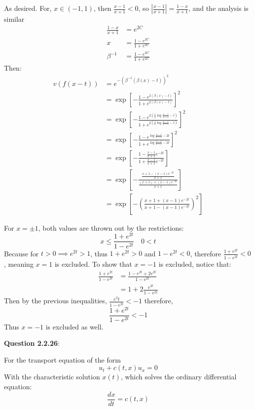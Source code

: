 \documentclass{article} %
\newcommand{\question}[2][]{
  \begin{flushleft}
    \textbf{Question #1}: \textit{#2}

\end{flushleft}}
\begin{document}
As desired. For, $x \in (-1, 1)$, then $\frac{x-1}{x+1} < 0$, so
$\left|\frac{x-1}{x+1}\right| = \frac{1-x}{x+1}$, and the analysis is similar
\begin{align*}
  \frac{1-x}{x+1} &= e^{2C} \\
  x &= \frac{1-e^{2C}}{1+e^{2C}} \\
  \beta^{-1} &= \frac{1-e^{2C}}{1+e^{2C}}
\end{align*}
Then:
\begin{align*}
  v(f(x - t)) &= e^{-(\beta^{-1}(\beta(x) - t))^2} \\
  &= \exp\left[-\frac{1-e^{2(\beta(x) - t)}}{1+e^{2(\beta(x) -t)}}\right]^2 \\
  &= \exp\left[-\frac{1-e^{2(\frac{1}{2}\log\frac{x-1}{x+1} -
  t)}}{1+e^{2(\frac{1}{2}\log\frac{x-1}{x+1} -t)}}\right]^2 \\
  &= \exp\left[-\frac{1-e^{\log\frac{x-1}{x+1} -
  2t}}{1+e^{\log\frac{x-1}{x+1} -2t}}\right]^2 \\
  &=
  \exp\left[-\frac{1-\frac{x-1}{x+1}e^{-2t}}{1+\frac{x-1}{x+1}e^{-2t}}\right] \\
  &= \exp\left[-\frac{\frac{x + 1 - (x -
  1)e^{-2t}}{x+1}}{\frac{(x+1) + (x-1)e^{-2t}}{x+1}}\right] \\
  &= \exp\left[-\left(\frac{x+1 +(x-1)e^{-2t}}{x+1 -
  (x-1)e^{-2t}}\right)^2 \right]
\end{align*}

For $x = \pm 1$, both values are thrown out by the restrictions:
\[
  x \le \frac{1 + e^{2t}}{1-e^{2t}} \quad 0 < t
\]
Because for $t > 0 \implies e^{2t} > 1$, thus $1 + e^{2t} > 0$ and $1
- e^{2t} < 0$, therefore $\frac{1 + e^{2t}}{1-e^{2t}} < 0$, meaning
$x = 1$ is excluded. To show that $x =-1$ is excluded, notice that:
\begin{align*}
  \frac{1+e^{2t}}{1-e^{2t}} &= \frac{1 - e^{2t} + 2e^{2t}}{1 - e^{2t}} \\
  &= 1 + 2\frac{e^{2t}}{1-e^{2t}}
\end{align*}
Then by the previous inequalities, $\frac{e^2t}{1-e^{2t}} < -1$ therefore,
\[
  \frac{1+e^{2t}}{1-e^{2t}} < -1
\]
Thus $x=-1$ is excluded as well.

\question[2.2.26]{ }
For the transport equation of the form
\[
  u_t + c(t,x)u_x = 0
\]
With the characteristic solution $x(t)$, which solves the ordinary
differential equation:
\[
  \frac{dx}{dt} = c(t,x)
\]
\end{document}
